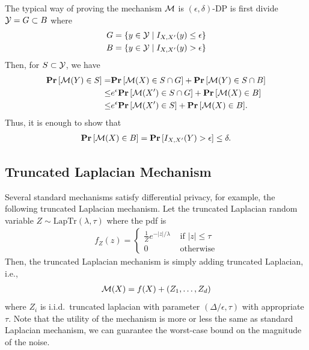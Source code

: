 \documentclass[11pt, a4paper]{article}
\begin{document}
The typical way of proving the mechanism ${\cal M}$ is $(\epsilon, \delta)$-DP is first divide ${\cal Y} = G\subset B$ where
\begin{align}
    G &= \{y\in{\cal Y} \mid I_{X, X'}(y) \leq \epsilon\}\\
    B &= \{y\in{\cal Y} \mid I_{X, X'}(y) > \epsilon\}\\
\end{align}
Then, for $S\subset {\cal Y}$, we have
\begin{align}
    \Prob{\cM(Y) \in S} =& \Prob{\cM(X)\in S\cap G} + \Prob{\cM(Y)\in S\cap B}\\
    \leq& e^\epsilon \Prob{\cM(X')\in S\cap G} + \Prob{\cM(X)\in B}\\
    \leq& e^\epsilon \Prob{\cM(X')\in S} + \Prob{\cM(X)\in B}.
\end{align}
Thus, it is enough to show that
\begin{align}
    \Prob{\cM(X)\in B } = \Prob{I_{X, X'}(Y) > \epsilon}\leq \delta.
\end{align}

\subsection{Truncated Laplacian Mechanism}
Several standard mechanisms satisfy differential privacy, for example, the following truncated Laplacian mechanism.
Let the truncated Laplacian random variable $Z\sim\mbox{LapTr}(\lambda, \tau)$ where the pdf is
\begin{align}
    f_Z(z) = \begin{cases} \frac{1}{Z} e^{-|z|/\lambda} &\mbox{ if $|z|\leq \tau$}\\
    0&\mbox{ otherwise}
    \end{cases}
\end{align}
Then, the truncated Laplacian mechanism is simply adding truncated Laplacian, i.e.,
\begin{align}
    {\cal M}(X) = f(X) + (Z_1, \dots, Z_d)
\end{align}
where $Z_i$ is i.i.d.\ truncated laplacian with parameter $(\Delta/\epsilon, \tau)$ with appropriate $\tau$.
Note that the utility of the mechanism is more or less the same as standard Laplacian mechanism,
we can guarantee the worst-case bound on the magnitude of the noise.
\end{document}

